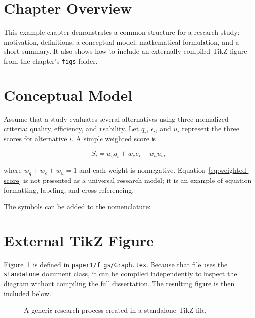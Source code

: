 \section{Chapter Overview}

This example chapter demonstrates a common structure for a research study: motivation, definitions, a conceptual model, mathematical formulation, and a short summary. It also shows how to include an externally compiled TikZ figure from the chapter's \texttt{figs} folder.

\section{Conceptual Model}

Assume that a study evaluates several alternatives using three normalized criteria: quality, efficiency, and usability. Let \(q_i\), \(e_i\), and \(u_i\) represent the three scores for alternative \(i\). A simple weighted score is

\begin{equation}
\label{eq:weighted-score}
S_i = w_q q_i + w_e e_i + w_u u_i,
\end{equation}

where \(w_q+w_e+w_u=1\) and each weight is nonnegative. Equation~\eqref{eq:weighted-score} is not presented as a universal research model; it is an example of equation formatting, labeling, and cross-referencing.

The symbols can be added to the nomenclature:

\section{External TikZ Figure}

Figure~\ref{fig:research-process} is defined in \texttt{paper1/figs/Graph.tex}. Because that file uses the \texttt{standalone} document class, it can be compiled independently to inspect the diagram without compiling the full dissertation. The resulting figure is then included below.

\begin{figure}[ht]
    \centering
    
    \caption{A generic research process created in a standalone TikZ file.}
    \label{fig:research-process}
\end{figure}

